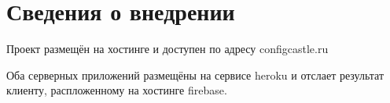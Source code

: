 \section{Сведения о внедрении}

Проект размещён на хостинге и доступен по адресу configcastle.ru

Оба серверных приложений размещёны на сервисе heroku и отслает результат клиенту, распложенному на хостинге firebase.
